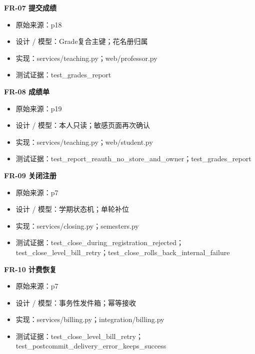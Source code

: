 \documentclass[UTF8,11pt,a4paper]{ctexart}
\providecommand{\tightlist}{\setlength{\itemsep}{0pt}\setlength{\parskip}{0pt}}
\begin{document}
\textbf{FR-07 提交成绩}

\begin{itemize}
\tightlist
\item
  原始来源：p18
\item
  设计 / 模型：Grade复合主键；花名册归属
\item
  实现：services/teaching.py；web/professor.py
\item
  测试证据：test\_\allowbreak{}grades\_\allowbreak{}report
\end{itemize}

\textbf{FR-08 成绩单}

\begin{itemize}
\tightlist
\item
  原始来源：p19
\item
  设计 / 模型：本人只读；敏感页面再次确认
\item
  实现：services/teaching.py；web/student.py
\item
  测试证据：test\_\allowbreak{}report\_\allowbreak{}reauth\_\allowbreak{}no\_\allowbreak{}store\_\allowbreak{}and\_\allowbreak{}owner；test\_\allowbreak{}grades\_\allowbreak{}report
\end{itemize}

\textbf{FR-09 关闭注册}

\begin{itemize}
\tightlist
\item
  原始来源：p7
\item
  设计 / 模型：学期状态机；单轮补位
\item
  实现：services/closing.py；semesters.py
\item
  测试证据：test\_\allowbreak{}close\_\allowbreak{}during\_\allowbreak{}registration\_\allowbreak{}rejected；test\_\allowbreak{}close\_\allowbreak{}level\_\allowbreak{}bill\_\allowbreak{}retry；test\_\allowbreak{}close\_\allowbreak{}rolls\_\allowbreak{}back\_\allowbreak{}internal\_\allowbreak{}failure
\end{itemize}

\textbf{FR-10 计费恢复}

\begin{itemize}
\tightlist
\item
  原始来源：p7
\item
  设计 / 模型：事务性发件箱；幂等接收
\item
  实现：services/billing.py；integration/billing.py
\item
  测试证据：test\_\allowbreak{}close\_\allowbreak{}level\_\allowbreak{}bill\_\allowbreak{}retry；test\_\allowbreak{}postcommit\_\allowbreak{}delivery\_\allowbreak{}error\_\allowbreak{}keeps\_\allowbreak{}success
\end{itemize}
\end{document}
